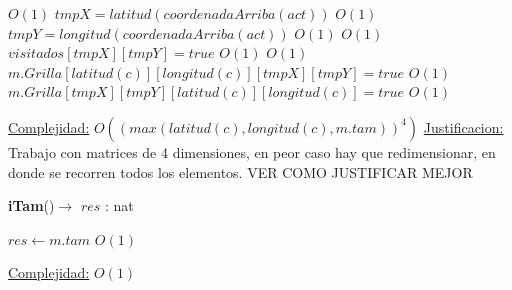 \begin{Algoritmos}
\begin{algorithmic}[1]
\State $ $

      \Comment $O(1)$
\State $tmpX = latitud(coordenadaArriba(act))$   \Comment $O(1)$
\State $tmpY = longitud(coordenadaArriba(act))$  \Comment $O(1)$
    \Comment $O(1)$
\State $visitados[tmpX][tmpY] = true$    \Comment $O(1)$
	 	\Comment $O(1)$
		\State $m.Grilla[latitud(c)][longitud(c)][tmpX][tmpY] = true$ \Comment $O(1)$
		\State $m.Grilla[tmpX][tmpY][latitud(c)][longitud(c)] = true$ \Comment $O(1)$
	\EndIf
\EndIf
\EndIf


\EndWhile

\medskip
\Statex \underline{Complejidad:} $O((max(latitud(c), longitud(c), m.tam))^4)$
\Statex \underline{Justificacion:} Trabajo con matrices de 4 dimensiones, en peor caso hay que redimensionar, en donde se recorren todos los elementos. VER COMO JUSTIFICAR MEJOR


\end{algorithmic}



\begin{algorithm}[H]
{\textbf{iTam}()$\to$ $res$ : nat}
\begin{algorithmic}[1]

\State $res \gets m.tam$ \Comment $O(1)$

\medskip
\Statex \underline{Complejidad:} $O(1)$

\end{algorithmic}
\end{algorithm}


  
\end{Algoritmos}